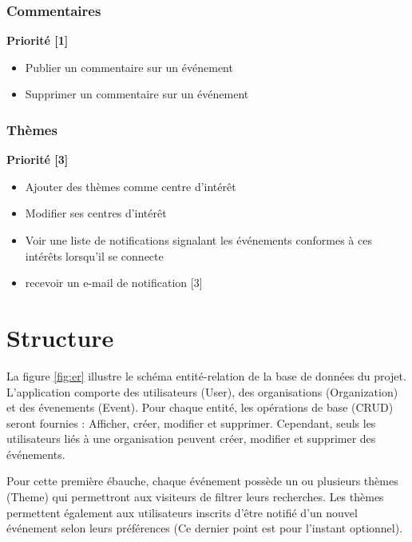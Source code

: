 \documentclass[11pt, a4paper, french, twoside]{article}
\begin{document}
			\subsubsection{Commentaires}
			\label{subsubsec:commentaires}
			
				\textbf{Priorité [1]}
			
				\begin{itemize}
					\item Publier un commentaire sur un événement
					\item Supprimer un commentaire sur un événement
				\end{itemize}
			
			\subsubsection{Thèmes}
			\label{subsubsec:themes}
			
			\textbf{Priorité [3]}
			
			\begin{itemize}
				\item Ajouter des thèmes comme centre d'intérêt
				\item Modifier ses centres d'intérêt
				\item Voir une liste de notifications signalant les événements conformes à ces intérêts lorsqu'il se connecte
				\item recevoir un e-mail de notification [3]
			\end{itemize}
		
	\section{Structure}
	\label{sec:structure}
		La figure \ref{fig:er} illustre le schéma entité-relation de la base de données du projet. L'application comporte des utilisateurs (User), des organisations (Organization) et des évenements (Event). Pour chaque entité, les opérations de base (CRUD) seront fournies : Afficher, créer, modifier et supprimer. Cependant, seuls les utilisateurs liés à une organisation peuvent créer, modifier et supprimer des événements.
		
		Pour cette première ébauche, chaque événement possède un ou plusieurs thèmes (Theme) qui permettront aux visiteurs de filtrer leurs recherches. Les thèmes permettent également aux utilisateurs inscrits d'être notifié d'un nouvel événement selon leurs préférences (Ce dernier point est pour l'instant optionnel).
		
\end{document}
